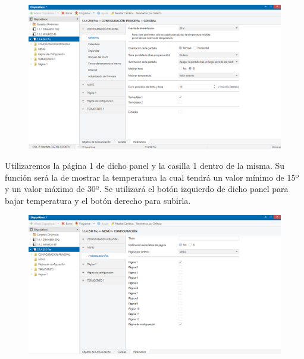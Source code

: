 \documentclass[10pt]{article}
\begin{document}
\begin{figure}[H]
	\begin{center}
	 		\includegraphics[width = 1.00\textwidth]{Imagenes/img24}
	\end{center} 
\end{figure}

Utilizaremos la página 1 de dicho panel y la casilla 1 dentro de la misma. Su función será la de mostrar la temperatura la cual tendrá un valor mínimo de 15º y un valor máximo de 30º. Se utilizará el botón izquierdo de dicho panel para bajar temperatura y el botón derecho para subirla. \\

\begin{figure}[H]
	\begin{center}
	 		\includegraphics[width = 1.00\textwidth]{Imagenes/img25}
	\end{center} 
\end{figure}
\end{document}
